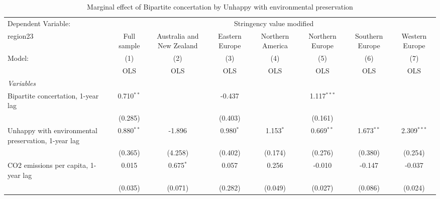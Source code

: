 
\begin{table}[htbp]
   \caption{Marginal effect of Bipartite concertation by Unhappy with environmental preservation}
   \centering
   \begin{tabular}{lccccccc}
      \toprule
      Dependent Variable: & \multicolumn{7}{c}{Stringency value modified}\\
      region23                                                                                 & Full sample    & Australia and New Zealand & Eastern Europe & Northern America & Northern Europe & Southern Europe & Western Europe \\   
      Model:                                                                                   & (1)            & (2)                       & (3)            & (4)              & (5)             & (6)             & (7)\\  
                                                                                               &  OLS           & OLS                       & OLS            & OLS              & OLS             & OLS             & OLS\\  
      \midrule
      \emph{Variables}\\
      Bipartite concertation, 1-year lag                                                       & 0.710$^{**}$   &                           & -0.437         &                  & 1.117$^{***}$   &                 &   \\   
                                                                                               & (0.285)        &                           & (0.403)        &                  & (0.161)         &                 &   \\   
      Unhappy with environmental preservation, 1-year lag                                      & 0.880$^{**}$   & -1.896                    & 0.980$^{*}$    & 1.153$^{*}$      & 0.669$^{**}$    & 1.673$^{**}$    & 2.309$^{***}$\\   
                                                                                               & (0.365)        & (4.258)                   & (0.402)        & (0.174)          & (0.276)         & (0.380)         & (0.254)\\   
      CO2 emissions per capita, 1-year lag                                                     & 0.015          & 0.675$^{*}$               & 0.057          & 0.256            & -0.010          & -0.147          & -0.037\\   
                                                                                               & (0.035)        & (0.071)                   & (0.282)        & (0.049)          & (0.027)         & (0.086)         & (0.024)\\   

\end{tabular}
\end{table}
